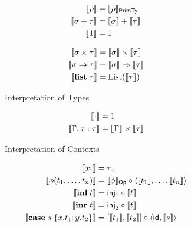 \begin{figure}
  \begin{subfigure}[t]{0.47\linewidth}
    \begin{minipage}{0.23\linewidth}
    \small
    \begin{align*}
      \llbracket \rho \rrbracket &= \llbracket \rho \rrbracket_{\mathsf{PrimTy}}
      \\
      \llbracket \sigma + \tau \rrbracket &= \textstyle {\llbracket \sigma \rrbracket} + {\llbracket \tau \rrbracket}
      \\
      \llbracket \mathbf{1} \rrbracket &= 1
    \end{align*}
  \end{minipage}
    \begin{minipage}{0.23\linewidth}
    \small
    \begin{align*}
      \llbracket \sigma \times \tau \rrbracket &= \llbracket \sigma \rrbracket \times \llbracket \tau \rrbracket
      \\
      \llbracket \sigma \to \tau \rrbracket &= \llbracket \sigma \rrbracket \Rightarrow \llbracket \tau \rrbracket
      \\
      \llbracket \mathbf{list}\;\tau \rrbracket &= \mathrm{List}(\llbracket \tau \rrbracket)
    \end{align*}
    \end{minipage}
    \caption{Interpretation of Types}
    \label{fig:semantics:types}
  \end{subfigure}
  \begin{subfigure}[t]{0.47\linewidth}
    \small
    \begin{align*}
      \llbracket \cdot \rrbracket &= 1
      \\
      \llbracket \Gamma, x: \tau \rrbracket &= \llbracket \Gamma \rrbracket \times \llbracket \tau \rrbracket
    \end{align*}
    \caption{Interpretation of Contexts}
    \label{fig:semantics:contexts}
\end{subfigure}
\begin{subfigure}{0.8\linewidth}
  \begin{minipage}{0.5\linewidth}
  \small
  \begin{align*}
  \sem{x_i} &= \pi_i
  \\
  \sem{\phi(t_1, \ldots, t_n)}
  &=
  \sem{\phi}_{\Op} \comp \prodM{\sem{t_1}}{\ldots, \sem{t_n}}
  \\
  \sem{\tmInl{t}} &= \mathsf{inj}_1 \comp \sem{t}
  \\
  \sem{\tmInr{t}} &= \mathsf{inj}_2 \comp \sem{t}
  \\
  \sem{\tmCase{s}{x}{t_1}{y}{t_2}} &= \coprodM{\sem{t_1}}{\sem{t_2}} \comp \prodM{\id}{\sem{s}}
  \\

\end{align*}
\end{minipage}
\end{subfigure}
\end{figure}
